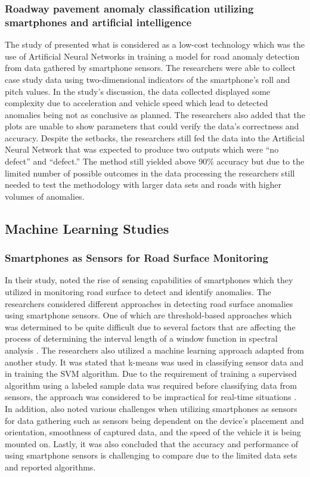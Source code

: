 \subsubsection{Roadway pavement anomaly classification utilizing smartphones and artificial intelligence}
The study of  presented what is considered as a low-cost technology which was the use of Artificial Neural Networks in training a model for road anomaly detection from data gathered by smartphone sensors. The researchers were able to collect case study data using two-dimensional indicators of the smartphone’s roll and pitch values. In the study’s discussion, the data collected displayed some complexity due to acceleration and vehicle speed which lead to detected anomalies being not as conclusive as planned. The researchers also added that the plots are unable to show parameters that could verify the data’s correctness and accuracy. Despite the setbacks, the researchers still fed the data into the Artificial Neural Network that was expected to produce two outputs which were “no defect” and “defect.” The method still yielded above 90\% accuracy but due to the limited number of possible outcomes in the data processing the researchers still needed to test the methodology with larger data sets and roads with higher volumes of anomalies.

\subsection{Machine Learning Studies}

\subsubsection{Smartphones as Sensors for Road Surface Monitoring}
In their study,  noted the rise of sensing capabilities of smartphones which they utilized in monitoring road surface to detect and identify anomalies. The researchers considered different approaches in detecting road surface anomalies using smartphone sensors. One of which are threshold-based approaches which was determined to be quite difficult  due to several factors that are affecting the process of determining the interval length of a window function in spectral analysis \cite{sattar2018}. The researchers also utilized a machine learning approach adapted from another study. It was stated that k-means was used in classifying sensor data and in training the SVM algorithm. Due to the requirement of training a supervised algorithm using a labeled sample data was required before classifying data from sensors, the approach was considered to be impractical for real-time situations \cite{sattar2018}. In addition,  also noted various challenges when utilizing smartphones as sensors for data gathering such as sensors being dependent on the device’s placement and orientation, smoothness of captured data, and the speed of the vehicle it is being mounted on. Lastly, it was also concluded that the accuracy and performance of using smartphone sensors is challenging to compare due to the limited data sets and reported algorithms.

